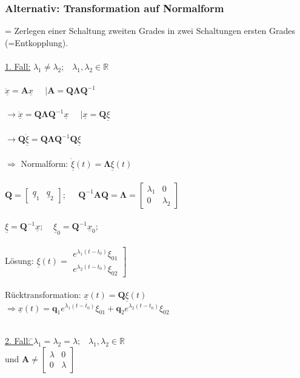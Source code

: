 \documentclass[a4paper,twocolumn,10pt]{article}
\begin{document}
\subsubsection*{Alternativ: Transformation auf Normalform}
= Zerlegen einer Schaltung zweiten Grades in zwei Schaltungen ersten Grades (=Entkopplung).\\\\
\underline{1. Fall:} $\lambda_1 \ne \lambda_2;\;\;\;\lambda_1,\lambda_2\in \mathbb{R}$\\\\
$\underline{\dot{x}}=\textbf{A}\underline{x}\;\;\;\;\;|\textbf{A}=\textbf{Q}\mathbf{\Lambda} \textbf{Q}^{-1}$\\\\
$\rightarrow\underline{\dot{x}}=\textbf{Q}\mathbf{\Lambda} \textbf{Q}^{-1}\underline{x}\;\;\;\;\;|\underline{x}=\textbf{Q}\underline{\xi}$\\\\
$\rightarrow\textbf{Q}\underline{\dot\xi}=\textbf{Q}\mathbf{\Lambda} \textbf{Q}^{-1}\textbf{Q}\underline{\xi}$\\\\
$\Rightarrow$ Normalform: $\underline{\dot{\xi}}(t)= \mathbf{\Lambda} \underline{\xi}(t)$\\\\
$\textbf{Q}=\begin{bmatrix}\underline{q}_1 & \underline{q}_2\end{bmatrix};\;\;\;\;\;\textbf{Q}^{-1}\textbf{A}\textbf{Q}=\mathbf{\Lambda} =\begin{bmatrix}\lambda_1 & 0 \\ 0 & \lambda_2\end{bmatrix}$\\\\
$\underline{\xi}=\textbf{Q}^{-1}\underline{x};\;\;\;\;\underline{\xi}_0=\textbf{Q}^{-1}\underline{x}_0;\;\;\;\;$\\\\
Lösung: $\underline{\xi} (t)=\left.\begin{matrix}e^{\lambda_1 (t-t_0)}\xi_{01} \\ e^{\lambda_2 (t-t_0)}\xi_{02}\end{matrix}\right]$\\\\
Rücktransformation: $\underline{x}(t)=\textbf{Q}\underline{\xi}(t)$\\
$\Rightarrow \underline{x}(t)= \textbf{q}_1 e^{\lambda_1 (t-t_0)} \xi_{01}+ \textbf{q}_2 e^{\lambda_2 (t-t_0)} \xi_{02} $
\begin{tabbing}\\

  \underline{2. Fall: \=$\lambda_1 = \lambda_2 =\lambda;\;\;\;\lambda_1,\lambda_2\in \mathbb{R}$\\}
  \> und $\textbf{A}\neq \begin{bmatrix}\lambda & 0 \\ 0 & \lambda\end{bmatrix}$
\end{tabbing}
\end{document}

